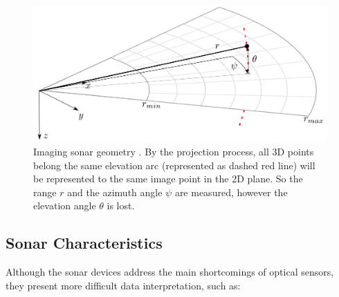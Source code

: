 \documentclass[final,5p,times]{elsarticle}
\begin{document}

\begin{figure}[h]
    \includegraphics[width=\columnwidth]{figs/sonar_geometry}
    \centering
    \captionsetup{justification=centering}
    \caption{Imaging sonar geometry \cite{huang2015}. By the projection process, all 3D points belong the same elevation arc (represented as dashed red line) will be represented to the same image point in the 2D plane. So the range $r$ and the azimuth angle $\psi$ are measured, however the elevation angle $\theta$ is lost.}
    \label{fig:sonar_geometry}
\end{figure}


\subsection{Sonar Characteristics}
\label{sonar:characteristics}

Although the sonar devices address the main shortcomings of optical sensors, they present more difficult data interpretation, such as:
\end{document}
